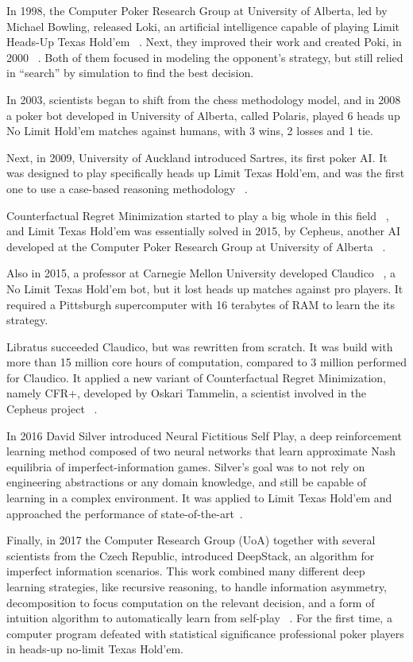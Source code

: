 In 1998, the Computer Poker Research Group at University of Alberta, led by Michael Bowling, released Loki, an artificial intelligence capable of playing Limit Heads-Up Texas Hold’em ~\cite{Billings2016}. Next, they improved their work and created Poki, in 2000 ~\cite{Davidson2000}. Both of them focused in modeling the opponent’s strategy, but still relied in “search” by simulation to find the best decision.

In 2003, scientists began to shift from the chess methodology model, and in 2008 a poker bot developed in University of Alberta, called Polaris, played 6 heads up No Limit Hold’em matches against humans, with 3 wins, 2 losses and 1 tie.

Next, in 2009, University of Auckland introduced Sartres, its first poker AI. It was designed to play specifically heads up Limit Texas Hold’em, and was the first one to use a case-based reasoning methodology ~\cite{Rubin2009}.

Counterfactual Regret Minimization started to play a big whole in this field ~\cite{Zikenvich2008}, and Limit Texas Hold’em was essentially solved in 2015, by Cepheus, another AI developed at the Computer Poker Research Group at University of Alberta ~\cite{Bowling2008}.

Also in 2015, a professor at Carnegie Mellon University developed Claudico ~\cite{Brown2015}, a No Limit Texas Hold’em bot, but it lost heads up matches against pro players. It required  a Pittsburgh supercomputer with 16 terabytes of RAM to learn the its strategy.

Libratus succeeded Claudico, but was rewritten from scratch. It was build with more than 15 million core hours of computation, compared to 3 million performed for Claudico. It applied a new variant of Counterfactual Regret Minimization, namely CFR+, developed by Oskari Tammelin, a scientist involved in the Cepheus project ~\cite{Brown2017}.

In 2016 David Silver introduced Neural Fictitious Self Play, a deep reinforcement learning method composed of two neural networks that learn approximate Nash equilibria of imperfect-information games. Silver's goal was to not rely on engineering abstractions or any domain knowledge, and still be capable of learning in a complex environment. It was applied to Limit Texas Hold'em and approached the performance of state-of-the-art~\cite{Silver2016}.

Finally, in 2017 the Computer Research Group (UoA) together with several scientists from the Czech Republic, introduced DeepStack, an algorithm for imperfect information scenarios. This work combined many different deep learning strategies, like recursive reasoning, to handle information asymmetry, decomposition to focus computation on the relevant decision, and a form of intuition algorithm to automatically learn from self-play ~\cite{Moravcik2017}. For the first time, a computer program defeated with statistical significance professional poker players in heads-up no-limit Texas Hold’em.


